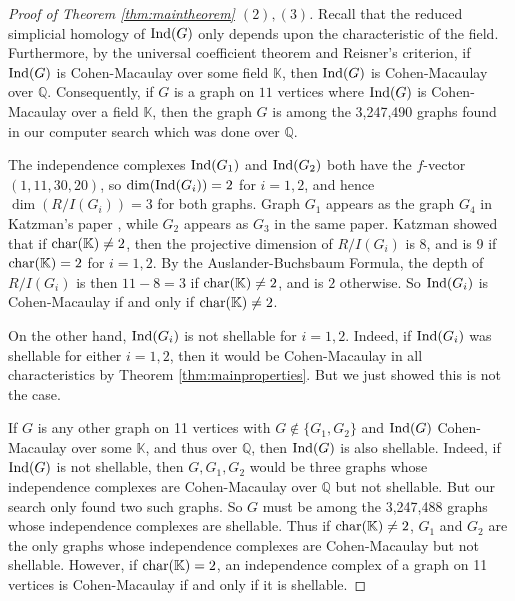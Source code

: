\documentclass[10pt,a4paper]{amsart}
\theoremstyle{plain}
\theoremstyle{definition}
\theoremstyle{remark}
\numberwithin{equation}{section}
\numberwithin{equation}{section}
\begin{document}
\begin{proof}[Proof of Theorem \ref{thm:maintheorem} $(2),(3)$]
Recall that the reduced simplicial homology 
of ${\rm Ind}(G)$ only depends
upon the characteristic of the field.   Furthermore,
by the universal coefficient theorem and Reisner's criterion,
if ${\rm Ind}(G)$ is Cohen-Macaulay over some field
$\mathbb{K}$, then ${\rm Ind}(G)$ is Cohen-Macaulay over
$\mathbb{Q}$.  Consequently, if $G$ is a graph on $11$
vertices where ${\rm Ind}(G)$ is 
Cohen-Macaulay over a field $\mathbb{K}$, then 
the graph $G$ is among
the 3,247,490 graphs found in our computer search
which was done over $\mathbb{Q}$.

The independence complexes ${\rm Ind}(G_1)$ and ${\rm Ind}(G_2)$ 
both have the $f$-vector $(1,11,30,20)$, so
$\dim({\rm Ind}(G_i))=2$ for $i=1,2$, and hence
$\dim(R/I(G_i))= 3$ for both graphs.   Graph $G_1$ appears as
the graph $G_4$ in Katzman's paper \cite{K2006}, 
while $G_2$ appears as $G_3$
in the same paper.  Katzman showed that if 
${\rm char}(\mathbb{K}) \neq 2$,
then the projective dimension of $R/I(G_i)$ is 8, and is 9 if 
${\rm char}(\mathbb{K}) = 2$ for $i=1,2$. 
By the Auslander-Buchsbaum Formula,
the depth of $R/I(G_i)$ is then 
$11-8=3$ if  ${\rm char}(\mathbb{K}) \neq 2$, and is $2$ otherwise.  So ${\rm Ind}(G_i)$ is
Cohen-Macaulay if and only if ${\rm char}(\mathbb{K}) \neq 2$.  

On the other hand, ${\rm Ind}(G_i)$ is not shellable for $i=1,2$.
Indeed, if ${\rm Ind}(G_i)$ was shellable for either $i=1,2$, then it would be Cohen-Macaulay in all characteristics by Theorem \ref{thm:mainproperties}. But we just showed this is not the case.

 If $G$ is any other graph on 11 vertices
 with $G \not\in \{G_1,G_2\}$ and ${\rm Ind}(G)$ Cohen-Macaulay
 over some $\mathbb{K}$, and thus over $\mathbb{Q}$, 
 then ${\rm Ind}(G)$ is also shellable.  Indeed,
 if ${\rm Ind}(G)$ is not shellable, then $G,G_1,G_2$ would
 be three graphs whose independence complexes are
 Cohen-Macaulay over
 $\mathbb{Q}$ but not shellable.  But our search only found two
 such graphs.  So $G$ must be among the 3,247,488
 graphs whose independence complexes are shellable.  Thus
 if ${\rm char}(\mathbb{K}) \neq 2$, $G_1$ and $G_2$
 are the only graphs whose independence complexes are Cohen-Macaulay
 but not shellable. However, if ${\rm char}(\mathbb{K}) =2$,
an independence complex of a graph on 11 vertices
is Cohen-Macaulay if and only if it is shellable.
\end{proof}
\end{document}
